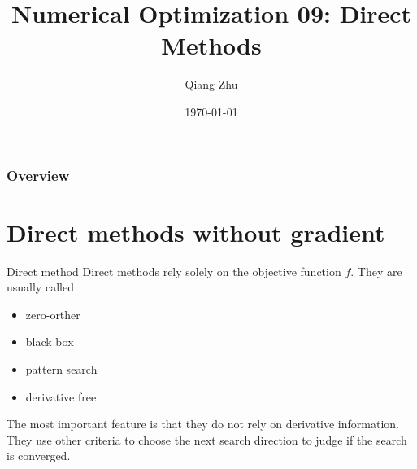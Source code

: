 \documentclass{beamer}
\title[Gradient Descent]{Numerical Optimization 09: Direct Methods} %
\author{Qiang Zhu} %
\institute[University of Nevada Las Vegas] %
{
University of Nevada Las Vegas\\ %
\medskip
}
\date{\today} %
\begin{document}
\begin{frame}
\titlepage %
\end{frame}

\begin{frame}
\frametitle{Overview} %
\tableofcontents %
\end{frame}



\section{Direct methods without gradient}
\begin{frame}{Direct method}
Direct methods rely solely on the objective function $f$. They are usually called
\begin{itemize}
    \item zero-orther
    \item black box
    \item pattern search
    \item derivative free
\end{itemize}

The most important feature is that they do not rely on derivative information. 
They use other criteria to choose the next search direction to judge if the search is converged.

\end{frame}
\end{document}
